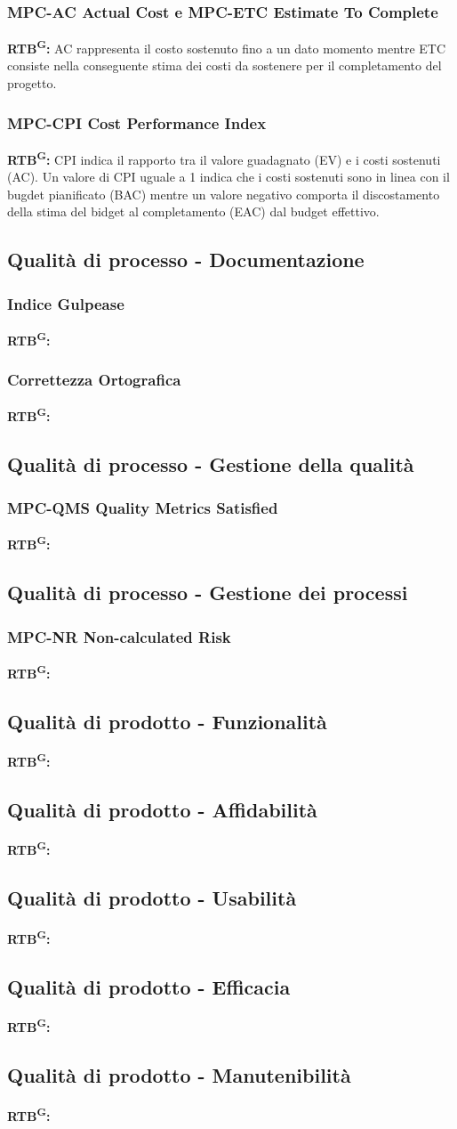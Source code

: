 \documentclass[8pt]{article}
\newcommand{\glossterm}[1]{#1\textsuperscript{G}} %
\begin{document}
\subsubsection{MPC-AC Actual Cost e MPC-ETC Estimate To Complete}
\textbf{\glossterm{RTB}:} AC rappresenta il costo sostenuto fino a un dato momento mentre ETC consiste nella conseguente stima dei costi da sostenere per il completamento del progetto.
\subsubsection{MPC-CPI Cost Performance Index}
\textbf{\glossterm{RTB}:} CPI indica il rapporto tra il valore guadagnato (EV) e i costi sostenuti (AC). Un valore di CPI uguale a 1 indica che i costi sostenuti sono in linea con il bugdet pianificato (BAC) mentre un valore negativo comporta il discostamento della stima del bidget al completamento (EAC) dal budget effettivo. 
\subsection{Qualità di processo - Documentazione}
\subsubsection{Indice Gulpease}
\textbf{\glossterm{RTB}:}
\subsubsection{Correttezza Ortografica}
\textbf{\glossterm{RTB}:}
\subsection{Qualità di processo - Gestione della qualità}
\subsubsection{MPC-QMS Quality Metrics Satisfied}
\textbf{\glossterm{RTB}:}
\subsection{Qualità di processo - Gestione dei processi}
\subsubsection{MPC-NR Non-calculated Risk}
\textbf{\glossterm{RTB}:}
\subsection{Qualità di prodotto - Funzionalità}
\textbf{\glossterm{RTB}:}
\subsection{Qualità di prodotto - Affidabilità}
\textbf{\glossterm{RTB}:}
\subsection{Qualità di prodotto - Usabilità}
\textbf{\glossterm{RTB}:}
\subsection{Qualità di prodotto - Efficacia}
\textbf{\glossterm{RTB}:}
\subsection{Qualità di prodotto - Manutenibilità}
\textbf{\glossterm{RTB}:}
\end{document}
